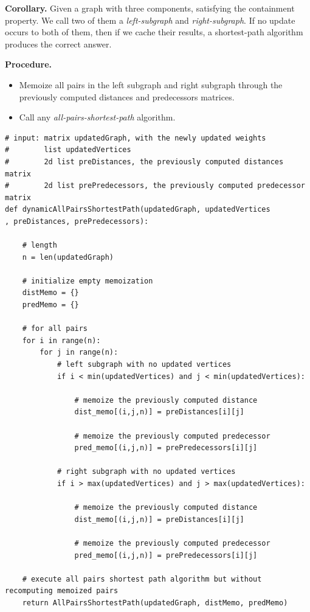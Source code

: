 \documentclass[pdflatex,sn-mathphys-num]{sn-jnl}%
\begin{document}
\textbf{Corollary.} Given a graph with three components, satisfying the containment property. We call two of them a \textit{left-subgraph} and \textit{right-subgraph}. If no update occurs to both of them, then if we cache their results, a shortest-path algorithm produces the correct answer.

\textbf{Procedure.}
\begin{itemize}
    \item Memoize all pairs in the left subgraph and right subgraph through the previously computed distances and predecessors matrices.
    \item Call any \textit{all-pairs-shortest-path} algorithm.
\end{itemize}

\begin{verbatim}
# input: matrix updatedGraph, with the newly updated weights
#        list updatedVertices
#        2d list preDistances, the previously computed distances matrix
#        2d list prePredecessors, the previously computed predecessor matrix
def dynamicAllPairsShortestPath(updatedGraph, updatedVertices
, preDistances, prePredecessors):
    
    # length
    n = len(updatedGraph)
    
    # initialize empty memoization
    distMemo = {}
    predMemo = {}
    
    # for all pairs
    for i in range(n):
        for j in range(n):
            # left subgraph with no updated vertices
            if i < min(updatedVertices) and j < min(updatedVertices):
            
                # memoize the previously computed distance
                dist_memo[(i,j,n)] = preDistances[i][j]
                
                # memoize the previously computed predecessor
                pred_memo[(i,j,n)] = prePredecessors[i][j]
            
            # right subgraph with no updated vertices
            if i > max(updatedVertices) and j > max(updatedVertices):
            
                # memoize the previously computed distance
                dist_memo[(i,j,n)] = preDistances[i][j]
                
                # memoize the previously computed predecessor
                pred_memo[(i,j,n)] = prePredecessors[i][j]
    
    # execute all pairs shortest path algorithm but without recomputing memoized pairs
    return AllPairsShortestPath(updatedGraph, distMemo, predMemo)
\end{verbatim}
\end{document}
